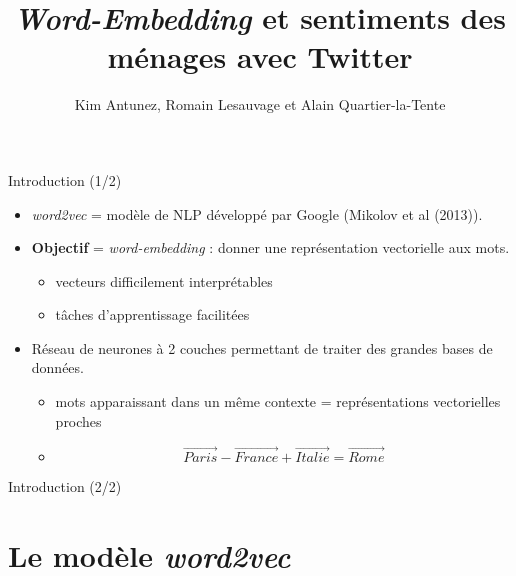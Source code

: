 \documentclass[10pt,xcolor=table,color={dvipsnames,usenames},ignorenonframetext,usepdftitle=false,french]{beamer}
\title{\emph{Word-Embedding} et sentiments des ménages avec Twitter}
\author{Kim Antunez, Romain Lesauvage et Alain Quartier-la-Tente}
\date{}
\providecommand{\tightlist}{%
  \setlength{\parskip}{0pt}
  }
\begin{document}
\begin{frame}
\titlepage
\end{frame}

\begin{frame}{Introduction (1/2)}
\protect\hypertarget{introduction-12}{}

\begin{itemize}
\item
  \emph{word2vec} = modèle de NLP développé par Google (Mikolov et al
  (2013)).
\item
  \textbf{Objectif} = \emph{word-embedding} : donner une représentation
  vectorielle aux mots.

  \begin{itemize}
  \tightlist
  \item
    \faMinusSquare{} vecteurs difficilement interprétables
  \item
    \faPlusSquare{} tâches d’apprentissage facilitées
  \end{itemize}
\end{itemize}

\pause

\bigskip

\begin{itemize}
\tightlist
\item
  \faArrowCircleRight{} Réseau de neurones à 2 couches permettant de
  traiter des grandes bases de données.

  \begin{itemize}
  \tightlist
  \item
    mots apparaissant dans un même contexte = représentations
    vectorielles proches
  \item
    \[
    \overrightarrow{Paris} - \overrightarrow{France} + \overrightarrow{Italie} = \overrightarrow{Rome}
    \]
  \end{itemize}
\end{itemize}

\end{frame}

\begin{frame}{Introduction (2/2)}
\protect\hypertarget{introduction-22}{}

\resizebox{\textwidth}{!}{}

\end{frame}

\hypertarget{le-moduxe8le-word2vec}{%
\section{\texorpdfstring{Le modèle
\emph{word2vec}}{Le modèle word2vec}}\label{le-moduxe8le-word2vec}}
\end{document}
